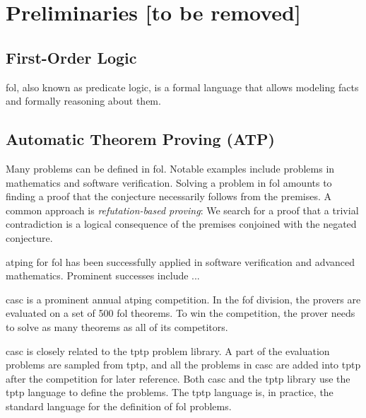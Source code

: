 \newcommand{\defn}\emph


\chapter{Preliminaries [to be removed]}

\section{First-Order Logic}

\Gls{fol}, also known as predicate logic, is a formal language that allows modeling facts and formally reasoning about them.

\section{Automatic Theorem Proving (ATP)}

Many problems can be defined in \gls{fol}.
Notable examples include problems in mathematics and software verification.
Solving a problem in \gls{fol} amounts to finding a proof that the conjecture necessarily follows from the premises.
A common approach is \defn{refutation-based proving}:
We search for a proof that a trivial contradiction is a logical consequence of the premises conjoined with the negated conjecture.

\Gls{atping} for \gls{fol} has been successfully applied in software verification and advanced mathematics.
Prominent successes include ...

\Gls{casc} is a prominent annual \gls{atping} competition.
In the \gls{fof} division, the provers are evaluated on a set of 500 \gls{fol} theorems.
To win the competition, the prover needs to solve as many theorems as all of its competitors.

\Gls{casc} is closely related to the \gls{tptp} problem library.
A part of the evaluation problems are sampled from \gls{tptp}, and all the problems in \gls{casc} are added into \gls{tptp} after the competition for later reference.
Both \gls{casc} and the \gls{tptp} library use the \gls{tptp} language to define the problems.
The \gls{tptp} language is, in practice, the standard language for the definition of \gls{fol} problems.

